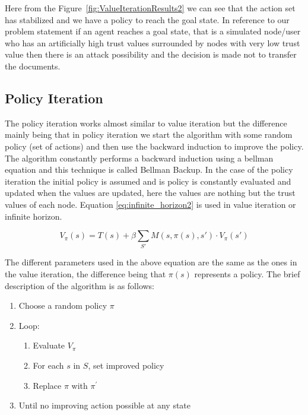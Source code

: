 Here from the Figure~\ref{fig:ValueIterationResults2} we can see that the action set has stabilized and we
have a policy to reach the goal state. In reference to our problem statement if
an agent reaches a goal state, that is a simulated node/user who has an
artificially high trust values surrounded by nodes with very low trust value
then there is an attack possibility and the decision is made not to transfer the
documents.

\subsection{Policy Iteration}

The policy iteration works almost similar to value iteration but the difference
mainly being that in policy iteration we start the algorithm with some random
policy (set of actions) and then use the backward induction to improve the
policy. The algorithm constantly performs a backward induction using a bellman
equation \autocite{Wikipedia2013} and this technique is called Bellman Backup. In the case of the
policy iteration the initial policy is assumed and is policy is constantly
evaluated and updated when the values are updated, here the values are nothing
but the trust values of each node.  Equation \ref{eq:infinite_horizon2} is used in value iteration
or infinite horizon.

\begin{equation} 
    \label{eq:infinite_horizon2}
    V_\pi(s) = T(s) + \beta \sum_{S'} M(s,\pi(s),s') \cdot V_\pi(s')
\end{equation}


The different parameters used in the above equation are the same as the ones in
the value iteration, the difference being that $\pi(s)$ represents a policy. The brief
description of the algorithm is as follows:
\begin{enumerate}
    \item Choose a random policy $\pi$
    \item Loop: 
        \begin{enumerate}
            \item Evaluate $V_\pi$ 
            \item For each $s$ in $S$, set improved policy
            \item Replace $\pi$ with $\pi^\prime$ 
        \end{enumerate}
        \item Until no improving action possible at any state
\end{enumerate}

